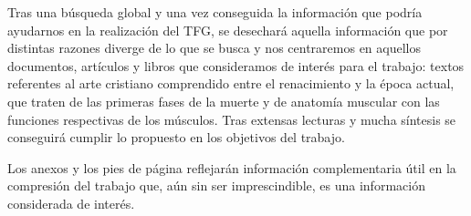 Tras una búsqueda global y una vez conseguida la información que podría ayudarnos en la realización del TFG, se desechará aquella información que por distintas razones diverge de lo que se busca y nos centraremos en aquellos documentos, artículos y libros que consideramos de interés para el trabajo: textos referentes al arte cristiano comprendido entre el renacimiento y la época actual, que traten de las primeras fases de la muerte y de anatomía muscular con las funciones respectivas de los músculos. Tras extensas lecturas y mucha síntesis se conseguirá cumplir lo propuesto en los objetivos del trabajo.

Los anexos y los pies de página reflejarán información complementaria útil en la compresión del trabajo que, aún sin ser imprescindible, es una información considerada de interés.
